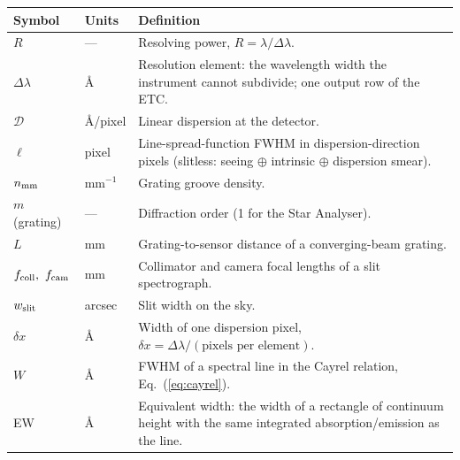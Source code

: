 \begin{tabular}{llp{8.6cm}}
\toprule
Symbol & Units & Definition \\
\midrule
$R$ & — & Resolving power, $R = \lambda/\Delta\lambda$. \\
$\Delta\lambda$ & \si{\angstrom} & Resolution element: the wavelength
  width the instrument cannot subdivide; one output row of the ETC. \\
$\mathcal{D}$ & \si{\angstrom}/pixel & Linear dispersion at the
  detector. \\
$\ell$ & pixel & Line-spread-function FWHM in dispersion-direction
  pixels (slitless: seeing $\oplus$ intrinsic $\oplus$ dispersion
  smear). \\
$n_{\rm mm}$ & mm$^{-1}$ & Grating groove density. \\
$m$ (grating) & — & Diffraction order (1 for the Star Analyser). \\
$L$ & mm & Grating-to-sensor distance of a converging-beam grating. \\
$f_{\rm coll},\ f_{\rm cam}$ & mm & Collimator and camera focal lengths
  of a slit spectrograph. \\
$w_{\rm slit}$ & arcsec & Slit width on the sky. \\
$\delta x$ & \si{\angstrom} & Width of one dispersion pixel,
  $\delta x = \Delta\lambda/(\text{pixels per element})$. \\
$W$ & \si{\angstrom} & FWHM of a spectral line in the Cayrel relation,
  Eq.~(\ref{eq:cayrel}). \\
EW & \si{\angstrom} & Equivalent width: the width of a rectangle of
  continuum height with the same integrated absorption/emission as the
  line. \\
\bottomrule
\end{tabular}
